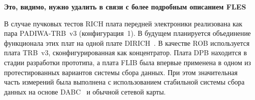 \textbf{Это, видимо, нужно удалить в связи с более подробным описанием FLES}


В случае пучковых тестов RICH плата передней электроники реализована как пара PADIWA-TRB~v3 (конфигурация~1). В будущем планируется объединение функционала этих плат на одной плате DIRICH~\cite{DIRICH}. В качестве ROB используется плата TRB~v3, сконфигурированная как концентратор. Плата DPB находится в стадии разработки прототипа, а плата FLIB была впервые применена в одном из протестированных вариантов системы сбора данных. При этом значительная часть измерений была выполнена с использованием стабильной системы сбора данных на основе DABC~\cite{DABC} и обычной сетевой карты.
